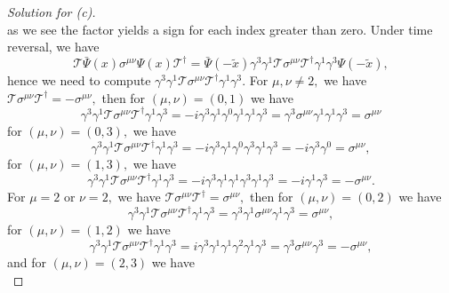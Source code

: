 \begin{proof}[Solution for (c)]
\begin{equation*}
   \end{equation*}
   as we see the factor yields a sign for each index greater than zero. Under time reversal, we have
   \begin{equation*}
      \mathscr{T} \bar{\Psi}(x) \sigma^{\mu\nu} \Psi(x) \mathscr{T}^\dag = \bar{\Psi}(- \tilde{x}) \gamma^3 \gamma^1 \mathscr{T}\sigma^{\mu\nu}\mathscr{T}^\dag \gamma^1 \gamma^3 \Psi(- \tilde{x}),
   \end{equation*}
   hence we need to compute \(\gamma^3 \gamma^1 \mathscr{T} \sigma^{\mu\nu} \mathscr{T}^\dag \gamma^1 \gamma^3.\) For \(\mu,\nu \neq 2,\) we have \(\mathscr{T}\sigma^{\mu\nu} \mathscr{T}^{\dag} = - \sigma^{\mu\nu},\) then for \((\mu,\nu) = (0,1)\) we have
   \begin{equation*}
      \gamma^3 \gamma^1 \mathscr{T} \sigma^{\mu\nu} \mathscr{T}^\dag \gamma^1 \gamma^3 = -i\gamma^3 \gamma^1 \gamma^0 \gamma^1 \gamma^1 \gamma^3 =  \gamma^3 \sigma^{\mu\nu} \gamma^1 \gamma^1 \gamma^3 =  \sigma^{\mu\nu}
   \end{equation*}
   for \((\mu, \nu) = (0,3),\) we have
   \begin{equation*}
      \gamma^3 \gamma^1 \mathscr{T} \sigma^{\mu\nu} \mathscr{T}^\dag \gamma^1 \gamma^3 = -i\gamma^3 \gamma^1 \gamma^0 \gamma^3 \gamma^1 \gamma^3 = -i \gamma^3 \gamma^0 = \sigma^{\mu\nu},
   \end{equation*}
   for \((\mu, \nu) = (1,3),\) we have
   \begin{equation*}
      \gamma^3 \gamma^1 \mathscr{T} \sigma^{\mu\nu} \mathscr{T}^\dag \gamma^1 \gamma^3 = -i\gamma^3 \gamma^1 \gamma^1 \gamma^3 \gamma^1 \gamma^3 = -i \gamma^1 \gamma^3 = -\sigma^{\mu\nu}.
   \end{equation*}
   For \(\mu = 2\) or \(\nu = 2,\) we have \(\mathscr{T}\sigma^{\mu\nu} \mathscr{T}^{\dag} = \sigma^{\mu\nu},\) then for \((\mu,\nu) = (0,2)\) we have
   \begin{equation*}
      \gamma^3 \gamma^1 \mathscr{T} \sigma^{\mu\nu} \mathscr{T}^\dag \gamma^1 \gamma^3 = \gamma^3 \gamma^1 \sigma^{\mu\nu} \gamma^1 \gamma^3 = \sigma^{\mu\nu},
   \end{equation*}
   for \((\mu,\nu) = (1,2)\) we have
   \begin{equation*}
      \gamma^3 \gamma^1 \mathscr{T} \sigma^{\mu\nu} \mathscr{T}^\dag \gamma^1 \gamma^3 = i\gamma^3 \gamma^1 \gamma^1\gamma^2 \gamma^1 \gamma^3 = \gamma^3\sigma^{\mu\nu} \gamma^3 = - \sigma^{\mu\nu},
   \end{equation*}
   and for \((\mu,\nu) = (2,3)\) we have
   \begin{equation*}

\end{equation*}
\end{proof}
